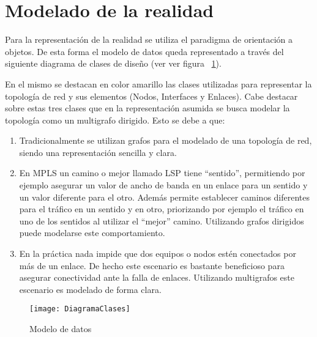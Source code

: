 
\section[Modelado de la realidad]{Modelado de la realidad}

Para la representaci\'on de la realidad se utiliza el paradigma de orientaci\'on a objetos. De esta forma el modelo de datos queda representado a través del siguiente diagrama de clases de diseño (ver ver figura ~\ref{fig:ModeloDeDatos}).

En el mismo se destacan en color amarillo las clases utilizadas para representar la topolog\'ia de red y sus elementos (Nodos, Interfaces y Enlaces). Cabe destacar sobre estas tres clases que en la representaci\'on asumida se busca modelar la topolog\'ia como un multigrafo dirigido. Esto se debe a que:

\begin{enumerate}
\item Tradicionalmente se utilizan grafos para el modelado de una topolog\'ia de red, siendo una representaci\'on sencilla y clara.

\item En MPLS un camino o mejor llamado LSP tiene “sentido”, permitiendo por ejemplo asegurar un valor de ancho de banda en un enlace para un sentido y un valor diferente para el otro. Adem\'as permite establecer caminos diferentes para el tr\'afico en un sentido y en otro, priorizando por ejemplo el tr\'afico  en uno de los sentidos al utilizar el “mejor” camino. Utilizando grafos dirigidos puede modelarse este comportamiento.

\item En la pr\'actica nada impide que dos equipos o nodos est\'en conectados por m\'as de un enlace. De hecho este escenario es bastante beneficioso para asegurar conectividad ante la falla de enlaces. Utilizando multigrafos este escenario es modelado de forma clara.
  
\end{enumerate}

\begin{figure}[ht!] 
\centering    
\texttt{[image: DiagramaClases]}
\caption[Modelo de datos]{Modelo de datos}
\label{fig:ModeloDeDatos}
\end{figure}


